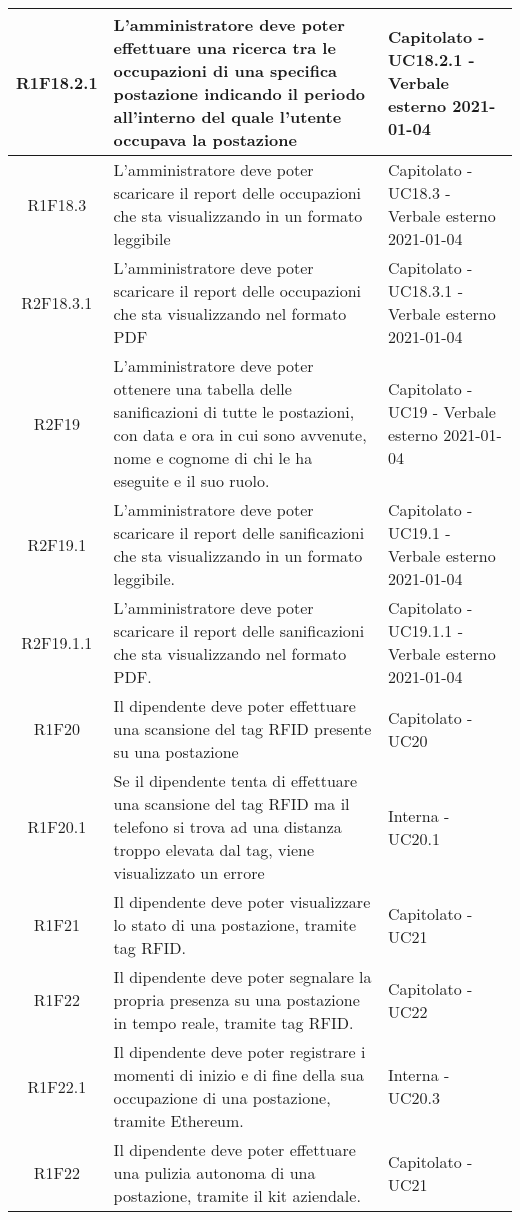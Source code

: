 \begin{center}
\begin{longtable}{|c|p{10cm}|p{4cm}|}
		\hline
		R1F18.2.1&L'amministratore deve poter effettuare una ricerca tra le occupazioni di una specifica postazione indicando il periodo all'interno del quale l'utente occupava la postazione	& 	Capitolato - UC18.2.1 - Verbale esterno 2021-01-04\\
		\hline
		R1F18.3 & L'amministratore deve poter scaricare il report delle occupazioni che sta visualizzando in un formato leggibile & Capitolato - UC18.3 - Verbale esterno 2021-01-04\\
		\hline
		R2F18.3.1 & L'amministratore deve poter scaricare il report delle occupazioni che sta visualizzando nel formato PDF & Capitolato - UC18.3.1 - Verbale esterno 2021-01-04\\
		\hline
		R2F19&L'amministratore deve poter ottenere una tabella delle sanificazioni di tutte le postazioni, con data e ora in cui sono avvenute, nome e cognome di chi le ha eseguite e il suo ruolo.	&Capitolato - UC19 - Verbale esterno 2021-01-04	\\
		\hline
		R2F19.1&L'amministratore deve poter scaricare il report delle sanificazioni che sta visualizzando in un formato leggibile.	&Capitolato - UC19.1 - Verbale esterno 2021-01-04	\\
		\hline
		R2F19.1.1&L'amministratore deve poter scaricare il report delle sanificazioni che sta visualizzando nel formato PDF.	&Capitolato - UC19.1.1 - Verbale esterno 2021-01-04	\\
		\hline
		R1F20 & Il dipendente deve poter effettuare una scansione del tag RFID presente su una postazione & Capitolato - UC20 \\
		\hline
		R1F20.1 & Se il dipendente tenta di effettuare una scansione del tag RFID ma il telefono si trova ad una distanza troppo elevata dal tag, viene visualizzato un errore & Interna - UC20.1 \\
		\hline
		R1F21&Il dipendente deve poter visualizzare lo stato di una postazione, tramite tag RFID.	&Capitolato - UC21 	\\
		\hline
		R1F22&Il dipendente deve poter segnalare la propria presenza su una postazione in tempo reale, tramite tag RFID.	&Capitolato - UC22 	\\
		\hline
		R1F22.1&Il dipendente deve poter registrare i momenti di inizio e di fine della sua occupazione di una postazione, tramite Ethereum.	&Interna - UC20.3 	\\
		\hline	
		R1F22&Il dipendente deve poter effettuare una pulizia autonoma di una postazione, tramite il kit aziendale.	&Capitolato - UC21	\\

\end{longtable}
\end{center}
